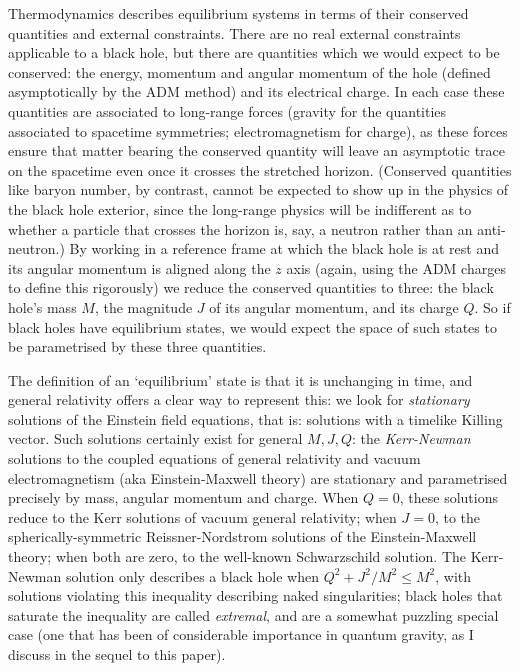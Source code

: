 \documentclass[12pt]{article}
\begin{document}
Thermodynamics describes equilibrium systems in terms of their conserved quantities and external constraints. There are no real external constraints applicable to a black hole, but there are quantities which we would expect to be conserved: the energy, momentum and angular momentum of the hole (defined asymptotically by the ADM method) and its electrical charge. In each case these quantities are associated to long-range forces (gravity for the quantities associated to spacetime symmetries; electromagnetism for charge), as these forces ensure that matter bearing the conserved quantity will leave an asymptotic trace on the spacetime even once it crosses the stretched horizon. (Conserved quantities like baryon number, by contrast, cannot be expected to show up in the physics of the black hole exterior, since the long-range physics will be indifferent as to whether a particle that crosses the horizon is, say, a neutron rather than an anti-neutron.)
By working in a reference frame at which the black hole is at rest and its angular momentum is aligned along the $z$ axis (again, using the ADM charges to define this rigorously) we reduce the conserved quantities to three: the black hole's mass $M$, the magnitude $J$ of its angular momentum, and its charge $Q$. So if black holes have equilibrium states, we would expect the space of such states to be parametrised by these three quantities.

The definition of an `equilibrium' state is that it is unchanging in time, and general relativity offers a clear way to represent this: we look for \emph{stationary} solutions of the Einstein field equations, that is: solutions with a timelike Killing vector. Such solutions certainly exist for general $M,J,Q$: the \emph{Kerr-Newman} solutions to the coupled equations of general relativity and vacuum electromagnetism (aka Einstein-Maxwell theory) are stationary and parametrised precisely by mass, angular momentum and charge. When $Q=0$, these solutions reduce to the Kerr solutions of vacuum general relativity; when $J=0$, to the spherically-symmetric Reissner-Nordstrom solutions of the Einstein-Maxwell theory; when both are zero, to the well-known Schwarzschild solution. The Kerr-Newman solution only describes a black hole when $Q^2 + J^2/M^2 \leq M^2$, with solutions violating this inequality describing naked singularities; black holes that saturate the inequality are called \emph{extremal}, and are a somewhat puzzling  special case (one that has been of considerable importance in quantum gravity, as I discuss in the sequel to this paper).
\end{document}
